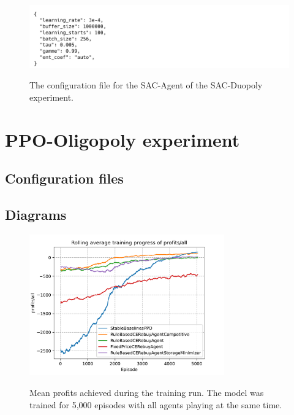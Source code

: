 \begin{figure}[ht]
	\includegraphics[width = \textwidth]{images/configs/SACDuopolyAgent.png}\\
	\caption{The configuration file for the SAC-Agent of the SAC-Duopoly experiment.}\label{fig:SACDuopolyConfigAgent}
\end{figure}

\clearpage
\section{PPO-Oligopoly experiment}\label{sec:AppendixOligopoly}

\subsection{Configuration files}\label{sec:AppendixOligopolyConfig}

\subsection{Diagrams}\label{sec:AppendixOligopolyDiagrams}

\begin{figure}[ht]
	\includegraphics[width = 0.75\textwidth]{images/experiments/PPOOligopoly/LineProfitsAll.pdf}\\
	\caption{Mean profits achieved during the training run. The model was trained for 5,000 episodes with all agents playing at the same time.}\label{fig:PPOOligopolyLineProfitsAll}
\end{figure}